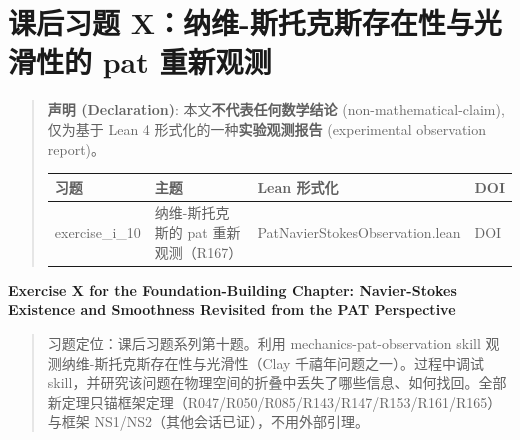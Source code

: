 \documentclass[
]{article}
\author{}
\date{}
\newcounter{none} %
\begin{document}
\section{课后习题 X：纳维-斯托克斯存在性与光滑性的 pat
重新观测}\label{ux7b51ux57faux7bc7ux8bfeux540eux4e60ux9898-xux7eb3ux7ef4-ux65afux6258ux514bux65afux5b58ux5728ux6027ux4e0eux5149ux6ed1ux6027ux7684-pat-ux91cdux65b0ux89c2ux6d4b}

\begin{quote}
\textbf{声明 (Declaration)}: 本文\textbf{不代表任何数学结论}
(non-mathematical-claim), 仅为基于 Lean 4
形式化的一种\textbf{实验观测报告} (experimental observation report)。

{\def\LTcaptype{none} %
\begin{longtable}[]{@{}
 >{\raggedright\arraybackslash}p{}
 >{\raggedright\arraybackslash}p{}
 >{\raggedright\arraybackslash}p{}
 >{\raggedright\arraybackslash}p{}@{}}
\toprule\noalign{}
\begin{minipage}[b]{\linewidth}\raggedright
习题
\end{minipage} & \begin{minipage}[b]{\linewidth}\raggedright
主题
\end{minipage} & \begin{minipage}[b]{\linewidth}\raggedright
Lean 形式化
\end{minipage} & \begin{minipage}[b]{\linewidth}\raggedright
DOI
\end{minipage} \\
\midrule\noalign{}
\endhead
\bottomrule\noalign{}
\endlastfoot
exercise\_i\_10 & 纳维-斯托克斯的 pat 重新观测（R167） &
PatNavierStokesObservation.lean & DOI \\
\end{longtable}
}
\end{quote}

\textbf{Exercise X for the Foundation-Building Chapter: Navier-Stokes
Existence and Smoothness Revisited from the PAT Perspective}

\begin{quote}
习题定位：课后习题系列第十题。利用 mechanics-pat-observation skill
观测纳维-斯托克斯存在性与光滑性（Clay 千禧年问题之一）。过程中调试
skill，并研究该问题在物理空间的折叠中丢失了哪些信息、如何找回。全部新定理只锚框架定理（R047/R050/R085/R143/R147/R153/R161/R165）与框架
NS1/NS2（其他会话已证），不用外部引理。
\end{quote}
\end{document}
